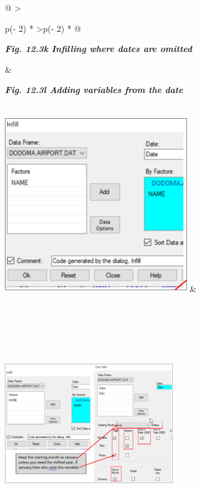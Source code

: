 \documentclass[
  letterpaper,
  DIV=11,
  numbers=noendperiod]{scrreprt}
\begin{document}
\begin{longtable}[]{@{}
  >{\raggedright\arraybackslash}p{(\columnwidth - 2\tabcolsep) * }
  >{\raggedleft\arraybackslash}p{(\columnwidth - 2\tabcolsep) * }@{}}
\toprule\noalign{}
\begin{minipage}[b]{\linewidth}\raggedright
\textbf{\emph{Fig. 12.3k Infilling where dates are omitted}}
\end{minipage} & \begin{minipage}[b]{\linewidth}\raggedleft
\textbf{\emph{Fig. 12.3l Adding variables from the date}}
\end{minipage} \\
\midrule\noalign{}
\endhead
\bottomrule\noalign{}
\endlastfoot
\includegraphics[width=3.10247in,height=2.98338in]{figures/Fig12.3k.png}
&
\includegraphics[width=2.85996in,height=4.37336in]{figures/Fig12.3l.png} \\
\end{longtable}
\end{document}
